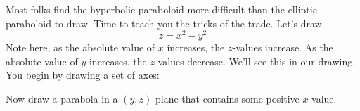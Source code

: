\documentclass{ximera}
\begin{document}
Most folks find the hyperbolic paraboloid more difficult than the
elliptic paraboloid to draw.  Time to teach you the tricks of the
trade. Let's draw
\[
z = x^2-y^2
\]
Note here, as the absolute value of $x$ increases, the $z$-values
increase. As the absolute value of $y$ increases, the $z$-values
decrease. We'll see this in our drawing. You begin by drawing a set of
axes:
\begin{image}
\end{image}
Now draw a parabola in a $(y,z)$-plane that contains some positive $x$-value.
\end{document}
